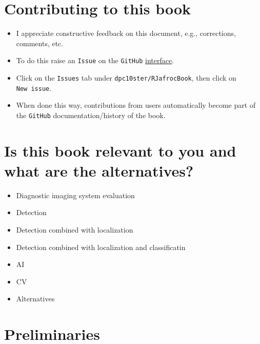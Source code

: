 \documentclass[
]{book}
\providecommand{\tightlist}{%
  \setlength{\itemsep}{0pt}\setlength{\parskip}{0pt}}
\begin{document}
\hypertarget{contributing-to-this-book}{%
\chapter*{Contributing to this book}\label{contributing-to-this-book}}

\begin{itemize}
\tightlist
\item
  I appreciate constructive feedback on this document, e.g., corrections, comments, etc.\\
\item
  To do this raise an \texttt{Issue} on the \texttt{GitHub} \href{https://github.com/dpc10ster/RJafrocBook}{interface}.
\item
  Click on the \texttt{Issues} tab under \texttt{dpc10ster/RJafrocBook}, then click on \texttt{New\ issue}.
\item
  When done this way, contributions from users automatically become part of the \texttt{GitHub} documentation/history of the book.
\end{itemize}

\hypertarget{is-this-book-relevant-to-you-and-what-are-the-alternatives}{%
\chapter*{Is this book relevant to you and what are the alternatives?}\label{is-this-book-relevant-to-you-and-what-are-the-alternatives}}

\begin{itemize}
\tightlist
\item
  Diagnostic imaging system evaluation
\item
  Detection
\item
  Detection combined with localization
\item
  Detection combined with localization and classificatin
\item
  AI
\item
  CV
\item
  Alternatives
\end{itemize}

\hypertarget{preliminaries}{%
\chapter{Preliminaries}\label{preliminaries}}
\end{document}
